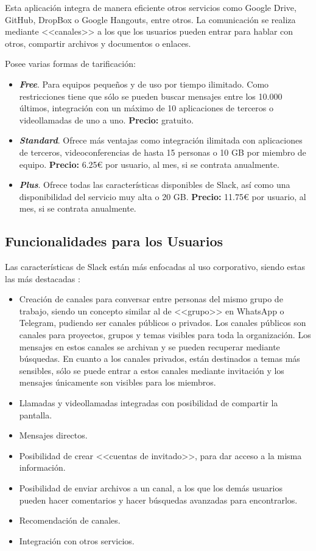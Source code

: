 Esta aplicación integra de manera eficiente otros servicios como Google Drive, GitHub, DropBox o Google Hangouts, entre otros. La comunicación se realiza mediante <<canales>> a los que los usuarios pueden entrar para hablar con otros, compartir archivos y documentos o enlaces.

Posee varias formas de tarificación:

\begin{itemize}
	\item \textbf{\textit{Free}}. Para equipos pequeños y de uso por tiempo ilimitado. Como restricciones tiene que sólo se pueden buscar mensajes entre los 10.000 últimos, integración con un máximo de 10 aplicaciones de terceros o videollamadas de uno a uno. \textbf{Precio:} gratuito.
	\item \textbf{\textit{Standard}}. Ofrece más ventajas como integración ilimitada con aplicaciones de terceros, videoconferencias de hasta 15 personas o 10 \acs{GB} por miembro de equipo. \textbf{Precio:} 6.25\euro{} por usuario, al mes, si se contrata anualmente.
	\item \textbf{\textit{Plus}}. Ofrece todas las características disponibles de Slack, así como una disponibilidad del servicio muy alta o 20 \acs{GB}. \textbf{Precio:} 11.75\euro{} por usuario, al mes, si se contrata anualmente.
\end{itemize}

\subsection{Funcionalidades para los Usuarios}
Las características de Slack están más enfocadas al uso corporativo, siendo estas las más destacadas \cite{Slack2017}:

\begin{itemize}
	\item Creación de canales para conversar entre personas del mismo grupo de trabajo, siendo un concepto similar al de <<grupo>> en WhatsApp o Telegram, pudiendo ser canales públicos o privados. Los canales públicos son canales para proyectos, grupos y temas visibles para toda la organización. Los mensajes en estos canales se archivan y se pueden recuperar mediante búsquedas. En cuanto a los canales privados, están destinados a temas más sensibles, sólo se puede entrar a estos canales mediante invitación y los mensajes únicamente son visibles para los miembros.

	\item Llamadas y videollamadas integradas con posibilidad de compartir la pantalla.
	\item Mensajes directos.
	\item Posibilidad de crear <<cuentas de invitado>>, para dar acceso a la misma información.
	\item Posibilidad de enviar archivos a un canal, a los que los demás usuarios pueden hacer comentarios y hacer búsquedas avanzadas para encontrarlos.
	\item Recomendación de canales.
	\item Integración con otros servicios.
\end{itemize}

